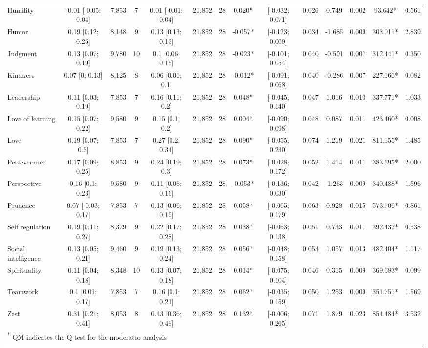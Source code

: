 \documentclass[
  man,floatsintext]{apa6}
\begin{document}
\begin{table}
{\begin{tabular}[t]{lccccccccccccc}
Humility & -0.01 [-0.05; 0.04] & 7,853 & 7 & 0.01 [-0.01; 0.04] & 21,852 & 28 & 0.020* & {}[-0.032;  0.071] & 0.026 & 0.749 & 0.002 & 93.642* & 0.561\\
\addlinespace
Humor & 0.19 [0.12; 0.25] & 8,148 & 9 & 0.13 [0.13; 0.13] & 21,852 & 28 & -0.057* & {}[-0.123;  0.009] & 0.034 & -1.685 & 0.009 & 303.011* & 2.839\\
Judgment & 0.13 [0.07; 0.19] & 9,780 & 10 & 0.1 [0.06; 0.15] & 21,852 & 28 & -0.023* & {}[-0.101;  0.054] & 0.040 & -0.591 & 0.007 & 312.441* & 0.350\\
Kindness & 0.07 [0; 0.13] & 8,125 & 8 & 0.06 [0.01; 0.1] & 21,852 & 28 & -0.012* & {}[-0.091;  0.068] & 0.040 & -0.286 & 0.007 & 227.166* & 0.082\\
Leadership & 0.11 [0.03; 0.19] & 7,853 & 7 & 0.16 [0.11; 0.2] & 21,852 & 28 & 0.048* & {}[-0.045;  0.140] & 0.047 & 1.016 & 0.010 & 337.771* & 1.033\\
Love of learning & 0.15 [0.07; 0.22] & 9,580 & 9 & 0.15 [0.1; 0.2] & 21,852 & 28 & 0.004* & {}[-0.090;  0.098] & 0.048 & 0.087 & 0.011 & 423.460* & 0.008\\
\addlinespace
Love & 0.19 [0.07; 0.3] & 7,853 & 7 & 0.27 [0.2; 0.34] & 21,852 & 28 & 0.090* & {}[-0.055;  0.230] & 0.074 & 1.219 & 0.021 & 811.155* & 1.485\\
Perseverance & 0.17 [0.09; 0.25] & 8,853 & 9 & 0.24 [0.19; 0.3] & 21,852 & 28 & 0.073* & {}[-0.028;  0.172] & 0.052 & 1.414 & 0.011 & 383.695* & 2.000\\
Perspective & 0.16 [0.1; 0.23] & 9,580 & 9 & 0.11 [0.06; 0.16] & 21,852 & 28 & -0.053* & {}[-0.136;  0.030] & 0.042 & -1.263 & 0.009 & 340.488* & 1.596\\
Prudence & 0.07 [-0.03; 0.17] & 7,853 & 7 & 0.13 [0.06; 0.19] & 21,852 & 28 & 0.058* & {}[-0.065;  0.179] & 0.063 & 0.928 & 0.015 & 573.706* & 0.861\\
Self regulation & 0.19 [0.11; 0.27] & 8,329 & 9 & 0.22 [0.17; 0.28] & 21,852 & 28 & 0.038* & {}[-0.063;  0.138] & 0.051 & 0.733 & 0.011 & 392.432* & 0.538\\
\addlinespace
Social intelligence & 0.13 [0.05; 0.21] & 9,460 & 9 & 0.19 [0.13; 0.24] & 21,852 & 28 & 0.056* & {}[-0.048;  0.158] & 0.053 & 1.057 & 0.013 & 482.404* & 1.117\\
Spirituality & 0.11 [0.04; 0.18] & 8,348 & 10 & 0.13 [0.07; 0.18] & 21,852 & 28 & 0.014* & {}[-0.075;  0.104] & 0.046 & 0.315 & 0.009 & 369.683* & 0.099\\
Teamwork & 0.1 [0.01; 0.17] & 7,853 & 7 & 0.16 [0.1; 0.21] & 21,852 & 28 & 0.062* & {}[-0.035;  0.159] & 0.050 & 1.253 & 0.009 & 351.751* & 1.569\\
Zest & 0.31 [0.21; 0.41] & 8,053 & 8 & 0.43 [0.36; 0.49] & 21,852 & 28 & 0.132* & {}[-0.006;  0.265] & 0.071 & 1.879 & 0.023 & 854.484* & 3.532\\
\bottomrule
\multicolumn{14}{l}{\textsuperscript{*} QM indicates the Q test for the moderator analysis}\\
\end{tabular}}
\end{table}
\end{document}
